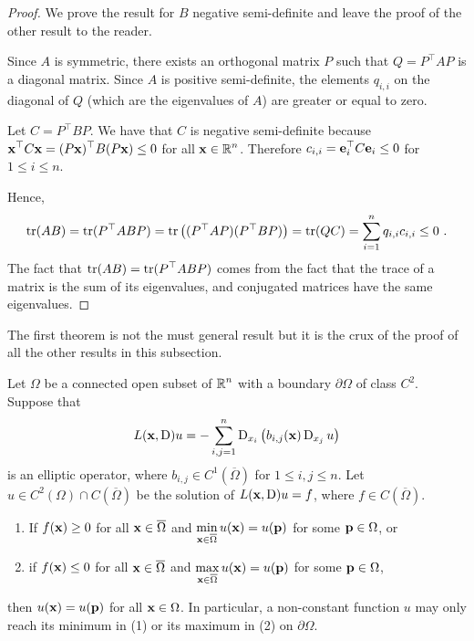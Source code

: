 \begin{proof}
We prove the result for $B$ negative semi-definite and leave the
proof of the other result to the reader.

Since $A$ is symmetric, there exists an orthogonal matrix $P$ such that
$\displaystyle Q = P^\top A P$ is a diagonal matrix.  Since $A$ is positive
semi-definite, the elements $q_{i,i}$ on the diagonal of $Q$ (which
are the eigenvalues of $A$) are greater or equal to zero.

Let $\displaystyle C = P^\top B P$.  We have that $C$ is negative
semi-definite because 
$\displaystyle \mathbf{x}^\top C \mathbf{x} = (P\mathbf{x})^\top B (P \mathbf{x}) \leq 0$
for all $\displaystyle \mathbf{x} \in \mathbb{R}^n$.  Therefore
$\displaystyle c_{i,i} = \mathbf{e}_i^\top C \mathbf{e}_i \leq 0$
for $1\leq i \leq n$.

Hence,
\[
  \operatorname{tr}(AB) = \operatorname{tr}(P^\top AB P) = \operatorname{tr}\big( (P^\top A P) (P^\top B P)\big)
  = \operatorname{tr}(Q C) = \sum_{i=1}^n q_{i,i} c_{i,i} \leq 0 \ .
\]
The fact that $\displaystyle \operatorname{tr}(AB) = \operatorname{tr}(P^\top AB P)$ comes from
the fact that the trace of a \nn matrix is the sum of its eigenvalues,
and conjugated matrices have the same eigenvalues.
\end{proof}

The first theorem is not the must general result but it is the crux of
the proof of all the other results in this subsection.

\begin{theorem} \label{ellStrongMaxA}
Let $\Omega$ be a connected open subset of $\displaystyle \mathbb{R}^n$ with a boundary
$\partial \Omega$ of class $\displaystyle C^2$.  Suppose that
\[
L(\mathbf{x},\operatorname{D})u = - \sum_{i,j=1}^n
\operatorname{D}_{x_i} \left( b_{i,j}(\mathbf{x}) \operatorname{D}_{x_j} u \right)
\]
is an elliptic operator, where
$\displaystyle b_{i,j} \in C^1(\overline{\Omega})$
for $1 \leq i,j\leq n$.
Let $\displaystyle u \in C^2(\Omega) \cap C(\overline{\Omega})$ be the
solution of $L(\mathbf{x},\operatorname{D})u = f$, where $f \in C(\overline{\Omega})$.
\begin{enumerate}
\item If $f(\mathbf{x}) \geq 0$ for all $\mathbf{x} \in \overline{\Omega}$
and $\displaystyle \min_{\mathbf{x}\in \overline{\Omega}} u(\mathbf{x}) = u(\mathbf{p})$
for some $\mathbf{p} \in \Omega$, or
\item if $f(\mathbf{x}) \leq 0$ for all $\mathbf{x} \in \overline{\Omega}$
and $\displaystyle \max_{\mathbf{x}\in \overline{\Omega}} u(\mathbf{x}) = u(\mathbf{p})$
for some $\mathbf{p} \in \Omega$,
\end{enumerate}
then $u(\mathbf{x})= u(\mathbf{p})$ for all $\mathbf{x} \in \Omega$.  In
particular, a non-constant function $u$ may only reach its minimum in
(1) or its maximum in (2) on $\partial \Omega$.
\end{theorem}

